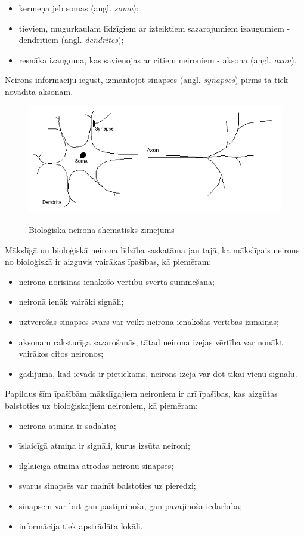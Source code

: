 \documentclass[12pt,paper=a4]{report}
\begin{document}
\begin{itemize}
\item ķermeņa jeb somas (angl. \textit{soma});
\item tieviem, mugurkaulam līdzīgiem ar izteiktiem sazarojumiem izaugumiem - dendrītiem (angl. \textit{dendrites}); 
\item resnāka izauguma, kas savienojas ar citiem neironiem - aksona (angl. \textit{axon}).
\end{itemize}
Neirons informāciju iegūst, izmantojot sinapses (angl. \textit{synapses}) pirms tā tiek novadīta aksonam. \cite{dennis1997introduction}
\begin{figure}[h!]
\centering
\includegraphics[width=.7\linewidth]{neuron}
\label{fig:neuron}
\caption{Bioloģiskā neirona shematisks zīmējums \cite{dennis1997introduction}}
\end{figure}\par
Mākslīgā un bioloģiskā neirona līdzība saskatāma jau tajā, ka mākslīgais neirons no bioloģiskā ir aizguvis vairākas īpašības, kā piemēram:
\begin{itemize}
\item neironā norisinās ienākošo vērtību svērtā summēšana;
\item neironā ienāk vairāki signāli;
\item uztverošās sinapses svars var veikt neironā ienākošās vērtības izmaiņas;
\item aksonam raksturīga sazarošanās, tātad neirona izejas vērtība var nonākt vairākos citos neironos;
\item gadījumā, kad ievads ir pietiekams, neirons izejā var dot tikai vienu signālu.
\end{itemize}
Papildus šīm īpašībām mākslīgajiem neironiem ir arī īpašības, kas aizgūtas balstoties uz bioloģiskajiem neironiem, kā piemēram:
\begin{itemize}
\item neironā atmiņa ir sadalīta;
\item īslaicīgā atmiņa ir signāli, kurus izsūta neironi;
\item ilglaicīgā atmiņa atrodas neironu sinapsēs;
\item svarus sinapsēs var mainīt balstoties uz pieredzi;
\item sinapsēm var būt gan pastiprinoša, gan pavājinoša iedarbība;
\item informācija tiek apstrādāta lokāli. \cite{fausett1994}
\end{itemize}\par
\end{document}
